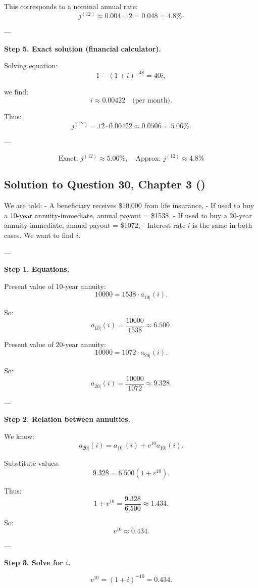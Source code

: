 \documentclass[12pt, a4paper]{article}
\begin{document}
{This corresponds to a nominal annual rate:
\[
j^{(12)} \approx 0.004 \cdot 12 = 0.048 = 4.8\%.
\]

---

\textbf{Step 5. Exact solution (financial calculator).}

Solving equation:
\[
1-(1+i)^{-48} = 40i,
\]

we find:
\[
i \approx 0.00422 \quad \text{(per month)}.
\]

Thus:
\[
j^{(12)} = 12 \cdot 0.00422 \approx 0.0506 = 5.06\%.
\]

---

\[
\boxed{\text{Exact: } j^{(12)} \approx 5.06\%, \quad \text{Approx: } j^{(12)} \approx 4.8\%}
\]

\subsection*{Solution to Question 30, Chapter 3 (\cite{toi3rd})}

We are told:  
- A beneficiary receives \$10{,}000 from life insurance,  
- If used to buy a 10-year annuity-immediate, annual payout = \$1538,  
- If used to buy a 20-year annuity-immediate, annual payout = \$1072,  
- Interest rate $i$ is the same in both cases.  
We want to find $i$.

---

\textbf{Step 1. Equations.}

Present value of 10-year annuity:
\[
10000 = 1538 \cdot a_{\overline{10}|}(i).
\]

So:
\[
a_{\overline{10}|}(i) = \frac{10000}{1538} \approx 6.500.
\]

Present value of 20-year annuity:
\[
10000 = 1072 \cdot a_{\overline{20}|}(i).
\]

So:
\[
a_{\overline{20}|}(i) = \frac{10000}{1072} \approx 9.328.
\]

---

\textbf{Step 2. Relation between annuities.}

We know:
\[
a_{\overline{20}|}(i) = a_{\overline{10}|}(i) + v^{10} a_{\overline{10}|}(i).
\]

Substitute values:
\[
9.328 = 6.500(1+v^{10}).
\]

Thus:
\[
1+v^{10} = \frac{9.328}{6.500} \approx 1.434.
\]

So:
\[
v^{10} \approx 0.434.
\]

---

\textbf{Step 3. Solve for $i$.}

\[
v^{10} = (1+i)^{-10} = 0.434.
\]

}
\end{document}
